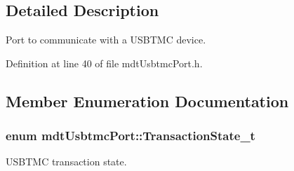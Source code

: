 \subsection{Detailed Description}
Port to communicate with a U\-S\-B\-T\-M\-C device. 

Definition at line 40 of file mdt\-Usbtmc\-Port.\-h.



\subsection{Member Enumeration Documentation}
\hypertarget{classmdt_usbtmc_port_a95543679f3981f4a061bb46731731868}{
\subsubsection[{Transaction\-State\-\_\-t}]{\setlength{\rightskip}{0pt plus 5cm}enum {\bf mdt\-Usbtmc\-Port\-::\-Transaction\-State\-\_\-t}\hspace{0.3cm}{\ttfamily [strong]}}}\label{classmdt_usbtmc_port_a95543679f3981f4a061bb46731731868}


U\-S\-B\-T\-M\-C transaction state. 

